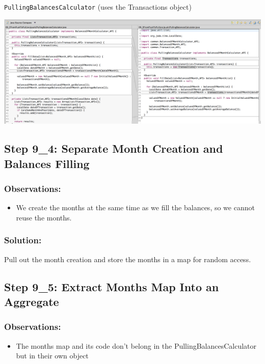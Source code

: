 \documentclass[a4paper,fleqn,titlepage,11pt]{article}
\begin{document}
\texttt{PullingBalancesCalculator} (uses the Transactions object)

\includegraphics[width=1\textwidth]{CompareViews/09_2-09_3-2.png}

\subsection*{Step 9\_4: Separate Month Creation and Balances Filling}

\subsubsection*{Observations:}
\begin{itemize}
\item We create the months at the same time as we fill the balances, so we cannot reuse the months.
\end{itemize}

\subsubsection*{Solution:}

Pull out the month creation and store the months in a map for random access.

\subsection*{Step 9\_5: Extract Months Map Into an Aggregate}

\subsubsection*{Observations:}
\begin{itemize}
\item The months map and its code don't belong in the PullingBalancesCalculator but in their own object
\end{itemize}
\end{document}
